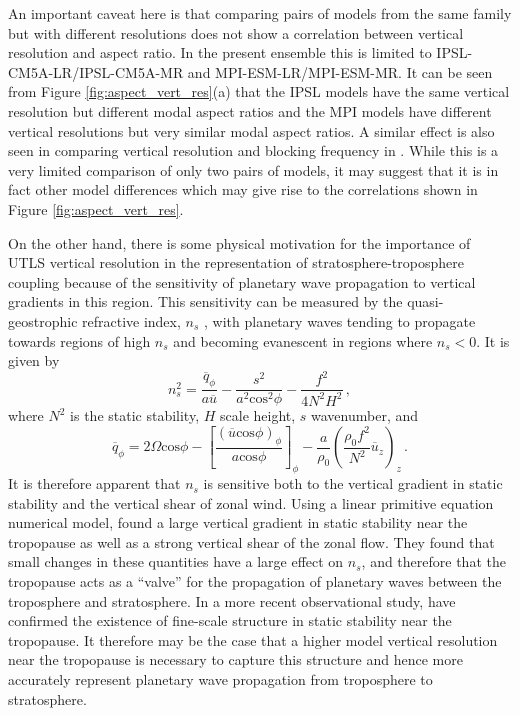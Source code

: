 An important caveat here is that comparing pairs of models from the same family
but with different resolutions does not show a correlation between vertical
resolution and aspect ratio. In the present ensemble this is limited to
IPSL-CM5A-LR/IPSL-CM5A-MR and MPI-ESM-LR/MPI-ESM-MR. It can be seen from Figure
\ref{fig:aspect_vert_res}(a) that the IPSL models have the same vertical
resolution but different modal aspect ratios and the MPI models have different
vertical resolutions but very similar modal aspect ratios. A similar effect is
also seen in comparing vertical resolution and blocking frequency in
\citet{Anstey2013}. While this is a very limited comparison of only two pairs of
models, it may suggest that it is in fact other model differences which may give
rise to the correlations shown in Figure \ref{fig:aspect_vert_res}. 

On the other hand, there is some physical motivation for the importance of UTLS
vertical resolution in the representation of stratosphere-troposphere coupling
because of the sensitivity of planetary wave propagation to vertical gradients
in this region. This sensitivity can be measured by the quasi-geostrophic
refractive index, $n_{s}$ \citep{Matsuno1970}, with planetary waves tending to
propagate towards regions of high $n_{s}$ and becoming evanescent in regions
where $n_{s}<0$. It is given by
\begin{equation}
  n_{s}^{2} = \frac{\overline{q}_{\phi}}{a\overline{u}} -
  \frac{s^{2}}{a^{2}\mathrm{cos}^{2}\phi} - \frac{f^{2}}{4N^{2}H^{2}} \, ,
\end{equation}
where $N^{2}$ is the static stability, $H$ scale height, $s$ wavenumber, and
\begin{equation}
  \overline{q}_{\phi} = 2\Omega\mathrm{cos}\phi - \left[
    \frac{(\overline{u}\mathrm{cos}\phi)_{\phi}}{a\mathrm{cos}\phi} \right]_{\phi} -
  \frac{a}{\rho_{0}}\left(\frac{\rho_{0}f^{2}}{N^{2}}\overline{u}_{z}\right)_{z}
  \, .
\end{equation}
It is therefore apparent that $n_{s}$ is sensitive both to the vertical
gradient in static stability and the vertical shear of zonal wind. Using a
linear primitive equation numerical model, \citet{Chen1992} found a large
vertical gradient in static stability near the tropopause as well as a strong
vertical shear of the zonal flow. They found that small changes in these
quantities have a large effect on $n_{s}$, and therefore that the tropopause
acts as a ``valve'' for the propagation of planetary waves between the
troposphere and stratosphere. In a more recent observational study,
\citet{Grise2010} have confirmed the existence of fine-scale structure in static
stability near the tropopause. It therefore may be the case that a higher model
vertical resolution near the tropopause is necessary to capture this structure
and hence more accurately represent planetary wave propagation from troposphere
to stratosphere. 

